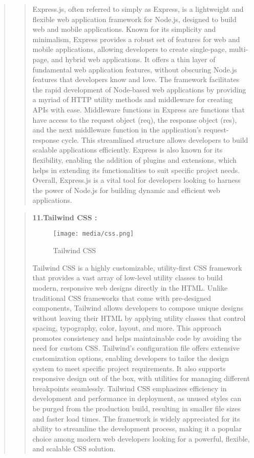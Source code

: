 \documentclass[12pt]{report}
\begin{document}
\begin{quote}
\begin{quote}
			Express.js, often referred to simply as Express, is a lightweight and flexible web application framework for Node.js, designed to build web and mobile applications. Known for its simplicity and minimalism, Express provides a robust set of features for web and mobile applications, allowing developers to create single-page, multi-page, and hybrid web applications. It offers a thin layer of fundamental web application features, without obscuring Node.js features that developers know and love. The framework facilitates the rapid development of Node-based web applications by providing a myriad of HTTP utility methods and middleware for creating APIs with ease. Middleware functions in Express are functions that have access to the request object (req), the response object (res), and the next middleware function in the application’s request-response cycle. This streamlined structure allows developers to build scalable applications efficiently. Express is also known for its flexibility, enabling the addition of plugins and extensions, which helps in extending its functionalities to suit specific project needs. Overall, Express.js is a vital tool for developers looking to harness the power of Node.js for building dynamic and efficient web applications.
		\end{quote}
		\clearpage
		
		\begin{quote}
			\textbf{11.Tailwind CSS :}\\
			\begin{figure}
				\centering
				\texttt{[image: media/css.png]}\\
				\caption{Tailwind CSS}
			\end{figure}
			
			Tailwind CSS is a highly customizable, utility-first CSS framework that provides a vast array of low-level utility classes to build modern, responsive web designs directly in the HTML. Unlike traditional CSS frameworks that come with pre-designed components, Tailwind allows developers to compose unique designs without leaving their HTML by applying utility classes that control spacing, typography, color, layout, and more. This approach promotes consistency and helps maintainable code by avoiding the need for custom CSS. Tailwind’s configuration file offers extensive customization options, enabling developers to tailor the design system to meet specific project requirements. It also supports responsive design out of the box, with utilities for managing different breakpoints seamlessly. Tailwind CSS emphasizes efficiency in development and performance in deployment, as unused styles can be purged from the production build, resulting in smaller file sizes and faster load times. The framework is widely appreciated for its ability to streamline the development process, making it a popular choice among modern web developers looking for a powerful, flexible, and scalable CSS solution.
		\end{quote}
		\clearpage
		

\end{quote}
\end{document}

